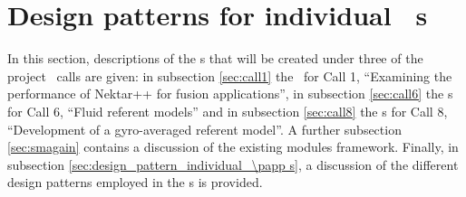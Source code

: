 \section{Design patterns for individual \nep\ \papp s}\label{sec:proxypat}

In this section, descriptions of the \papp s that will be created under three of
the project \nep\ calls are given:
in subsection \ref{sec:call1} the \papp\  for Call 1, ``Examining the
performance of Nektar++ for fusion applications'',
in subsection \ref{sec:call6} the \papp s for Call 6, ``Fluid referent models''
and in subsection \ref{sec:call8} the \papp s for Call 8, ``Development of a
gyro-averaged referent model''.
A further subsection \ref{sec:smagain} contains a discussion of the existing 
 modules framework.
Finally, in subsection \ref{sec:design_pattern_individual_\papp s}, a discussion
of the different design patterns employed in the \papp s is provided.






\clearpage

\clearpage
